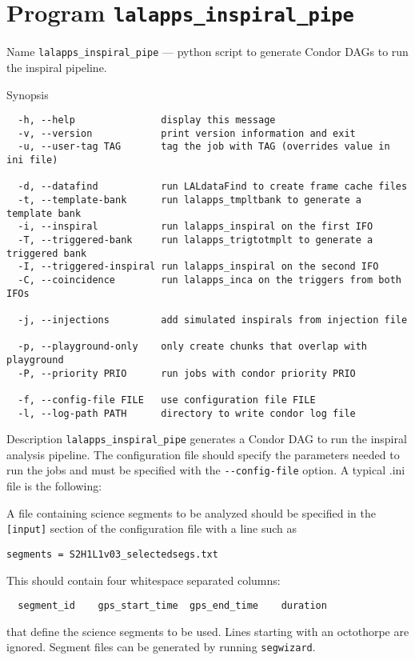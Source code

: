 \section{Program \texttt{lalapps\_inspiral\_pipe}}
\label{program:inspiral-pipeline}

\begin{entry}
\item[Name]
\verb$lalapps_inspiral_pipe$ --- python script to generate Condor DAGs to
run the inspiral pipeline.

\item[Synopsis]
\begin{verbatim}
  -h, --help               display this message
  -v, --version            print version information and exit
  -u, --user-tag TAG       tag the job with TAG (overrides value in ini file)

  -d, --datafind           run LALdataFind to create frame cache files
  -t, --template-bank      run lalapps_tmpltbank to generate a template bank
  -i, --inspiral           run lalapps_inspiral on the first IFO
  -T, --triggered-bank     run lalapps_trigtotmplt to generate a triggered bank
  -I, --triggered-inspiral run lalapps_inspiral on the second IFO
  -C, --coincidence        run lalapps_inca on the triggers from both IFOs

  -j, --injections         add simulated inspirals from injection file

  -p, --playground-only    only create chunks that overlap with playground
  -P, --priority PRIO      run jobs with condor priority PRIO

  -f, --config-file FILE   use configuration file FILE
  -l, --log-path PATH      directory to write condor log file
\end{verbatim}

\item[Description] \verb$lalapps_inspiral_pipe$ generates a Condor DAG to run
the inspiral analysis pipeline. The configuration file should specify the
parameters needed to run the jobs and must be specified with the
\verb$--config-file$ option. A typical .ini file is the following:


A file containing science segments to be
analyzed should be specified in the \verb$[input]$ section of the
configuration file with a line such as
\begin{verbatim}
segments = S2H1L1v03_selectedsegs.txt
\end{verbatim}
This should contain four whitespace separated columns:
\begin{verbatim}
  segment_id    gps_start_time  gps_end_time    duration
\end{verbatim}
that define the science segments to be used. Lines starting with an octothorpe
are ignored.
Segment files can be generated by running \verb$segwizard$.


\end{entry}

